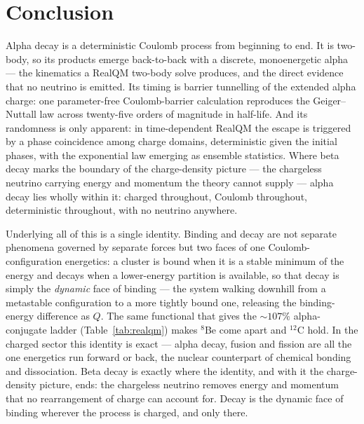 \documentclass[11pt]{article}
\begin{document}
\section{Conclusion}
\label{sec:concl}

Alpha decay is a deterministic Coulomb process from beginning to end. It is two-body, so its products emerge
back-to-back with a discrete, monoenergetic alpha --- the kinematics a RealQM two-body solve produces, and
the direct evidence that no neutrino is emitted. Its timing is barrier tunnelling of the extended alpha
charge: one parameter-free Coulomb-barrier calculation reproduces the Geiger--Nuttall law across
twenty-five orders of magnitude in half-life. And its randomness is only apparent: in time-dependent RealQM
the escape is triggered by a phase coincidence among charge domains, deterministic given the initial phases,
with the exponential law emerging as ensemble statistics. Where beta decay marks the boundary of the
charge-density picture --- the chargeless neutrino carrying energy and momentum the theory cannot supply
\cite{BetaCompanion} --- alpha decay lies wholly within it: charged throughout, Coulomb throughout,
deterministic throughout, with no neutrino anywhere.

Underlying all of this is a single identity. Binding and decay are not separate phenomena governed by
separate forces but two faces of one Coulomb-configuration energetics: a cluster is bound when it is a
stable minimum of the energy and decays when a lower-energy partition is available, so that decay is simply
the \emph{dynamic} face of binding --- the system walking downhill from a metastable configuration to a more
tightly bound one, releasing the binding-energy difference as $Q$. The same functional that gives the
$\sim107\%$ alpha-conjugate ladder (Table~\ref{tab:realqm}) makes $^8$Be come apart and $^{12}$C hold. In
the charged sector this identity is exact --- alpha decay, fusion and fission are all the one energetics run
forward or back, the nuclear counterpart of chemical bonding and dissociation. Beta decay is exactly where
the identity, and with it the charge-density picture, ends: the chargeless neutrino removes energy and
momentum that no rearrangement of charge can account for. Decay is the dynamic face of binding wherever the
process is charged, and only there.
\end{document}

